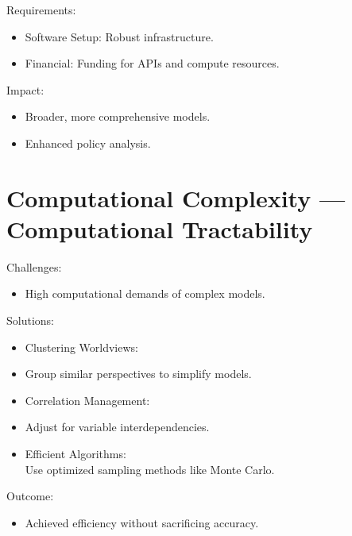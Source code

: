 \documentclass[
  letterpaper,
]{book}
\providecommand{\tightlist}{%
  \setlength{\itemsep}{0pt}\setlength{\parskip}{0pt}}
\begin{document}
Requirements:

\begin{itemize}
\tightlist
\item
  Software Setup: Robust infrastructure.\\
\item
  Financial: Funding for APIs and compute resources.
\end{itemize}

Impact:

\begin{itemize}
\tightlist
\item
  Broader, more comprehensive models.\\
\item
  Enhanced policy analysis.
\end{itemize}

\section{Computational Complexity --- Computational
Tractability}\label{computational-complexity-computational-tractability}

Challenges:

\begin{itemize}
\tightlist
\item
  High computational demands of complex models.
\end{itemize}

Solutions:

\begin{itemize}
\tightlist
\item
  Clustering Worldviews:\\
\item
  Group similar perspectives to simplify models.\\
\item
  Correlation Management:\\
\item
  Adjust for variable interdependencies.\\
\item
  Efficient Algorithms:\\
  Use optimized sampling methods like Monte Carlo.
\end{itemize}

Outcome:

\begin{itemize}
\tightlist
\item
  Achieved efficiency without sacrificing accuracy.
\end{itemize}
\end{document}
